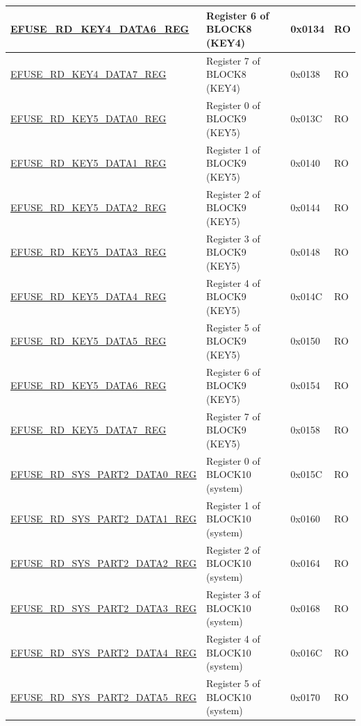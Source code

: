 \begin{longtable}{ | p{6cm} | p{7.2cm} | p{1.3cm} | p{1cm} | }
\hyperref[regdesc:EFUSERDKEY4DATA6REG]{EFUSE\_RD\_KEY4\_DATA6\_REG} & Register 6 of BLOCK8 (KEY4)  & 0x0134 & RO \\ \hline
\hyperref[regdesc:EFUSERDKEY4DATA7REG]{EFUSE\_RD\_KEY4\_DATA7\_REG} & Register 7 of BLOCK8 (KEY4)  & 0x0138 & RO \\ \hline
\hyperref[regdesc:EFUSERDKEY5DATA0REG]{EFUSE\_RD\_KEY5\_DATA0\_REG} & Register 0 of BLOCK9 (KEY5)  & 0x013C & RO \\ \hline
\hyperref[regdesc:EFUSERDKEY5DATA1REG]{EFUSE\_RD\_KEY5\_DATA1\_REG} & Register 1 of BLOCK9 (KEY5)  & 0x0140 & RO \\ \hline
\hyperref[regdesc:EFUSERDKEY5DATA2REG]{EFUSE\_RD\_KEY5\_DATA2\_REG} & Register 2 of BLOCK9 (KEY5)  & 0x0144 & RO \\ \hline
\hyperref[regdesc:EFUSERDKEY5DATA3REG]{EFUSE\_RD\_KEY5\_DATA3\_REG} & Register 3 of BLOCK9 (KEY5)  & 0x0148 & RO \\ \hline
\hyperref[regdesc:EFUSERDKEY5DATA4REG]{EFUSE\_RD\_KEY5\_DATA4\_REG} & Register 4 of BLOCK9 (KEY5)  & 0x014C & RO \\ \hline
\hyperref[regdesc:EFUSERDKEY5DATA5REG]{EFUSE\_RD\_KEY5\_DATA5\_REG} & Register 5 of BLOCK9 (KEY5)  & 0x0150 & RO \\ \hline
\hyperref[regdesc:EFUSERDKEY5DATA6REG]{EFUSE\_RD\_KEY5\_DATA6\_REG} & Register 6 of BLOCK9 (KEY5)  & 0x0154 & RO \\ \hline
\hyperref[regdesc:EFUSERDKEY5DATA7REG]{EFUSE\_RD\_KEY5\_DATA7\_REG} & Register 7 of BLOCK9 (KEY5)  & 0x0158 & RO \\ \hline
\hyperref[regdesc:EFUSERDSYSPART2DATA0REG]{EFUSE\_RD\_SYS\_PART2\_DATA0\_REG} & Register 0 of BLOCK10 (system)  & 0x015C & RO \\ \hline
\hyperref[regdesc:EFUSERDSYSPART2DATA1REG]{EFUSE\_RD\_SYS\_PART2\_DATA1\_REG} & Register 1 of BLOCK10 (system)  & 0x0160 & RO \\ \hline
\hyperref[regdesc:EFUSERDSYSPART2DATA2REG]{EFUSE\_RD\_SYS\_PART2\_DATA2\_REG} & Register 2 of BLOCK10 (system)  & 0x0164 & RO \\ \hline
\hyperref[regdesc:EFUSERDSYSPART2DATA3REG]{EFUSE\_RD\_SYS\_PART2\_DATA3\_REG} & Register 3 of BLOCK10 (system)  & 0x0168 & RO \\ \hline
\hyperref[regdesc:EFUSERDSYSPART2DATA4REG]{EFUSE\_RD\_SYS\_PART2\_DATA4\_REG} & Register 4 of BLOCK10 (system)  & 0x016C & RO \\ \hline
\hyperref[regdesc:EFUSERDSYSPART2DATA5REG]{EFUSE\_RD\_SYS\_PART2\_DATA5\_REG} & Register 5 of BLOCK10 (system)  & 0x0170 & RO \\ \hline

\end{longtable}
